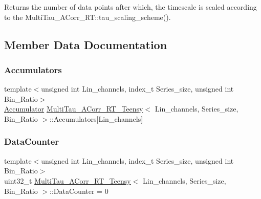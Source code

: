 Returns the number of data points after which, the timescale is scaled according to the Multi\+Tau\+\_\+\+A\+Corr\+\_\+\+R\+T\+::tau\+\_\+scaling\+\_\+scheme(). 

\subsection{Member Data Documentation}
\mbox{\label{classMultiTau__ACorr__RT__Teensy_a5b6f2659e905f143bc898a9b803eae24}} 
\subsubsection{\texorpdfstring{Accumulators}{Accumulators}}
{\footnotesize\ttfamily template$<$unsigned int Lin\+\_\+channels, index\+\_\+t Series\+\_\+size, unsigned int Bin\+\_\+\+Ratio$>$ \\
\hyperlink{classAccumulator}{Accumulator} \hyperlink{classMultiTau__ACorr__RT__Teensy}{Multi\+Tau\+\_\+\+A\+Corr\+\_\+\+R\+T\+\_\+\+Teensy}$<$ Lin\+\_\+channels, Series\+\_\+size, Bin\+\_\+\+Ratio $>$\+::Accumulators\mbox{[}Lin\+\_\+channels\mbox{]}\hspace{0.3cm}{\ttfamily [private]}}

\mbox{\label{classMultiTau__ACorr__RT__Teensy_ac403944f1456e09036bef6dc60d5a0b2}} 
\subsubsection{\texorpdfstring{Data\+Counter}{DataCounter}}
{\footnotesize\ttfamily template$<$unsigned int Lin\+\_\+channels, index\+\_\+t Series\+\_\+size, unsigned int Bin\+\_\+\+Ratio$>$ \\
uint32\+\_\+t \hyperlink{classMultiTau__ACorr__RT__Teensy}{Multi\+Tau\+\_\+\+A\+Corr\+\_\+\+R\+T\+\_\+\+Teensy}$<$ Lin\+\_\+channels, Series\+\_\+size, Bin\+\_\+\+Ratio $>$\+::Data\+Counter = 0}



